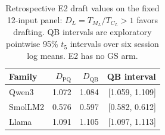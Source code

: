 \begin{table}[t]\centering\small
\caption{Retrospective E2 draft values on the fixed 12-input panel: $D_L=T_{M_L}/T_{C_L}>1$ favors drafting. QB intervals are exploratory pointwise 95\% $t_5$ intervals over six session log means. E2 has no GS arm.}\label{tab:e2draft}
\begin{tabular}{@{}lrrr@{}}\toprule
Family & $D_{\mathrm{PQ}}$ & $D_{\mathrm{QB}}$ & QB interval\\\midrule
Qwen3 & 1.072 & 1.084 & [1.059, 1.109]\\
SmolLM2 & 0.576 & 0.597 & [0.582, 0.612]\\
Llama & 1.091 & 1.105 & [1.097, 1.113]\\
\bottomrule\end{tabular}
\end{table}
